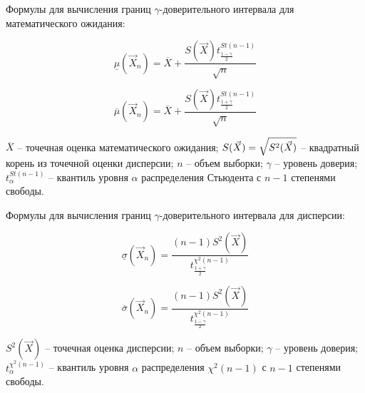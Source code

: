 Формулы для вычисления границ $\gamma$-доверительного интервала для математического ожидания:

\begin{equation}
\underline\mu(\vec X_n)=\overline X + \frac{S(\vec X)t^{St(n-1)}_{\frac{1-\gamma}{2}}}{\sqrt{n}}
\end{equation}

\begin{equation}
\overline\mu(\vec X_n)=\overline X + \frac{S(\vec X)t^{St(n-1)}_{\frac{1+\gamma}{2}}}{\sqrt{n}}
\end{equation}

$\overline X$ -- точечная оценка математического ожидания;
$S(\vec X) = \sqrtsign{S^2(\vec X)}$ -- квадратный корень из точечной оценки дисперсии;
$n$ -- объем выборки;
$\gamma$ -- уровень доверия;
$t^{St(n-1)}_{\alpha}$ -- квантиль уровня $\alpha$ распределения Стьюдента с $n - 1$ степенями свободы.

Формулы для вычисления границ $\gamma$-доверительного интервала для дисперсии:

\begin{equation}
\underline\sigma(\vec X_n)= \frac{(n-1)S^2(\vec X)}{t^{\chi^2(n-1)}_{\frac{1+\gamma}{2}}}
\end{equation}

\begin{equation}
\overline\sigma(\vec X_n)= \frac{(n-1)S^2(\vec X)}{t^{\chi^2(n-1)}_{\frac{1-\gamma}{2}}}
\end{equation}

$S^2(\vec X)$ -- точечная оценка дисперсии;
$n$ -- объем выборки;
$\gamma$ -- уровень доверия;
$t^{\chi^2(n-1)}_{\alpha}$ -- квантиль уровня $\alpha$ распределения $\chi^2(n-1)$ с $n - 1$ степенями свободы.